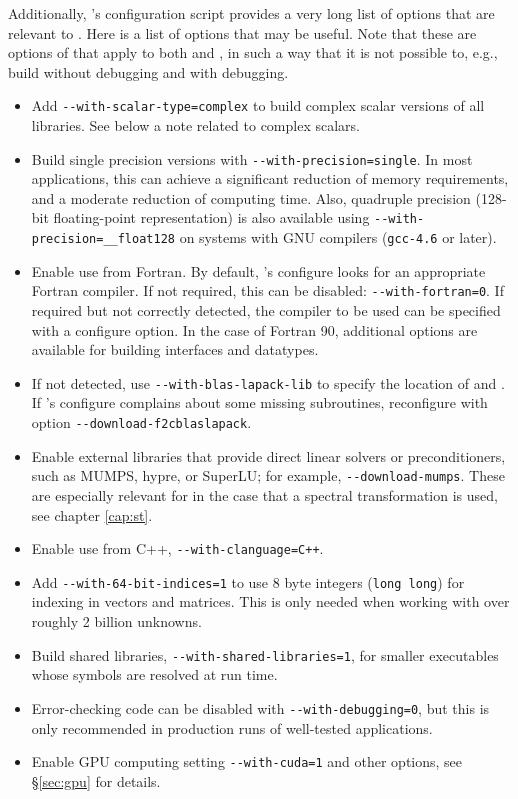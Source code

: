 Additionally, \petsc's configuration script provides a very long list of options that are relevant to \slepc. Here is a list of options that may be useful. Note that these are options of \petsc that apply to both \petsc and \slepc, in such a way that it is not possible to, e.g., build \petsc without debugging and \slepc with debugging.
\begin{itemize}
\item Add \Verb!--with-scalar-type=complex! to build complex scalar versions of all libraries. See below a note related to complex scalars.
\item Build single precision versions with \Verb!--with-precision=single!. In most applications, this can achieve a significant reduction of memory requirements, and a moderate reduction of computing time. Also, quadruple precision (128-bit floating-point representation) is also available using \Verb!--with-precision=__float128! on systems with GNU compilers (\texttt{gcc-4.6} or later).
\item Enable use from Fortran. By default, \petsc's configure looks for an appropriate Fortran compiler. If not required, this can be disabled: \Verb!--with-fortran=0!. If required but not correctly detected, the compiler to be used can be specified with a configure option. In the case of Fortran 90, additional options are available for building interfaces and datatypes.
\item If not detected, use \Verb!--with-blas-lapack-lib! to specify the location of \blas and \lapack. If \slepc's configure complains about some missing \lapack subroutines, reconfigure \petsc with option \Verb!--download-f2cblaslapack!.
\item Enable external libraries that provide direct linear solvers or preconditioners, such as MUMPS, hypre, or SuperLU; for example, \Verb!--download-mumps!. These are especially relevant for \slepc in the case that a spectral transformation is used, see chapter \ref{cap:st}.
\item Enable use from C++, \Verb!--with-clanguage=C++!.
\item Add \Verb!--with-64-bit-indices=1! to use 8 byte integers (\texttt{long long}) for indexing in vectors and matrices. This is only needed when working with over roughly 2 billion unknowns.
\item Build shared libraries, \Verb!--with-shared-libraries=1!, for smaller executables whose symbols are resolved at run time.
\item Error-checking code can be disabled with \Verb!--with-debugging=0!, but this is only recommended in production runs of well-tested applications.
\item Enable GPU computing setting \Verb!--with-cuda=1! and other options, see \S\ref{sec:gpu} for details.
\end{itemize}

